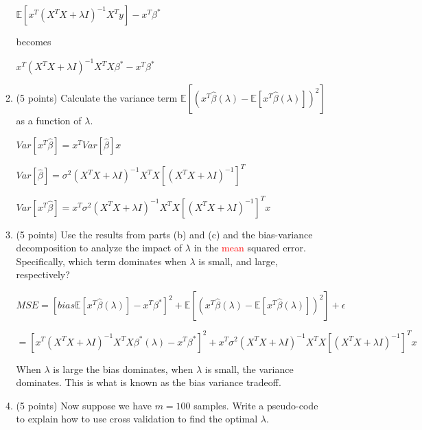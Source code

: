 \documentclass[twoside,10pt]{article}
\begin{document}
\begin{enumerate}
\begin{enumerate}
\vspace{2 mm}

$\mathbb E[x^T {(X^TX + \lambda I)^{-1} X^T y}] - x^T {\beta^*}$

\vspace{2 mm}

becomes

\vspace{2 mm}

$x^T {(X^TX + \lambda I)^{-1} X^T X {\beta^*}} - x^T {\beta^*}$

\vspace{5 mm}

\item (5 points) Calculate the variance term $\mathbb E\left[\left(x^T {\hat \beta}(\lambda) - \mathbb E[x^T {\hat \beta}(\lambda)] \right)^2\right]$ as a function of $\lambda$.

\vspace{5 mm}

$Var[x^T\hat\beta] = x^T Var[\hat\beta] x$

$Var[\hat\beta]  = \sigma^2 (X^TX + \lambda I)^{-1} X^T X [(X^TX + \lambda I)^{-1}]^T$

$Var[x^T\hat\beta]  = x^T \sigma^2 (X^TX + \lambda I)^{-1} X^T X [(X^TX + \lambda I)^{-1}]^T x$

\item (5 points) Use the results from parts (b) and (c) and the bias-variance decomposition to analyze the impact of $\lambda$ in the \textcolor{red}{mean} squared error. Specifically, which term dominates when $\lambda$ is small, and large, respectively?

$MSE = [bias  \mathbb E[x^T {\hat \beta}(\lambda)] - x^T {\beta^*}]^2 + \mathbb E\left[\left(x^T {\hat \beta}(\lambda) - \mathbb E[x^T {\hat \beta}(\lambda)] \right)^2\right] + \epsilon$

\vspace{2 mm}

$= [x^T {(X^TX + \lambda I)^{-1} X^T X {\beta^*}}(\lambda) - x^T {\beta^*}]^2 + x^T \sigma^2 (X^TX + \lambda I)^{-1} X^T X [(X^TX + \lambda I)^{-1}]^T x$ 
\vspace{5 mm}


When $\lambda$ is large the bias dominates, when $\lambda$ is small, the variance dominates. This is what is known as the bias variance tradeoff.

\vspace{5 mm}

\item (5 points) Now suppose we have $m= 100$ samples. Write a pseudo-code to explain how to use cross validation to find the optimal $\lambda$.


\end{enumerate}
\end{enumerate}
\end{document}
